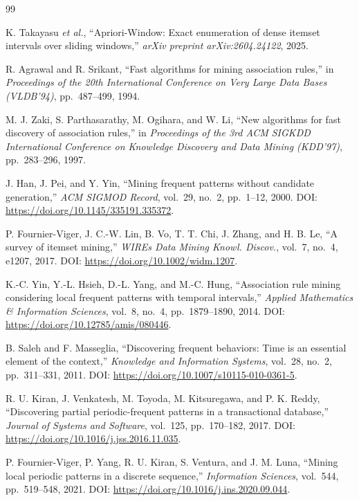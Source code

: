 \documentclass[10pt,twocolumn]{AROB}
\begin{document}
\begin{thebibliography}{99}

K. Takayasu {\it et al.},
``Apriori-Window: Exact enumeration of dense itemset intervals over sliding windows,''
{\it arXiv preprint arXiv:2604.24122}, 2025.

R. Agrawal and R. Srikant,
``Fast algorithms for mining association rules,''
in \textit{Proceedings of the 20th International Conference on Very Large Data Bases (VLDB'94)},
pp.~487--499, 1994.

M. J. Zaki, S. Parthasarathy, M. Ogihara, and W. Li,
``New algorithms for fast discovery of association rules,''
in \textit{Proceedings of the 3rd ACM SIGKDD International Conference on Knowledge Discovery and Data Mining (KDD'97)},
pp.~283--296, 1997.

J. Han, J. Pei, and Y. Yin,
``Mining frequent patterns without candidate generation,''
\textit{ACM SIGMOD Record}, vol.~29, no.~2, pp.~1--12, 2000.
DOI: \url{https://doi.org/10.1145/335191.335372}.

P. Fournier-Viger, J. C.-W. Lin, B. Vo, T. T. Chi, J. Zhang, and H. B. Le,
``A survey of itemset mining,''
{\it WIREs Data Mining Knowl. Discov.}, vol.~7, no.~4, e1207, 2017.
DOI: \url{https://doi.org/10.1002/widm.1207}.

K.-C. Yin, Y.-L. Hsieh, D.-L. Yang, and M.-C. Hung,
``Association rule mining considering local frequent patterns with temporal intervals,''
{\it Applied Mathematics \& Information Sciences}, vol.~8, no.~4,
pp.~1879--1890, 2014.
DOI: \url{https://doi.org/10.12785/amis/080446}.

B. Saleh and F. Masseglia,
``Discovering frequent behaviors: Time is an essential element of the context,''
{\it Knowledge and Information Systems}, vol.~28, no.~2, pp.~311--331, 2011.
DOI: \url{https://doi.org/10.1007/s10115-010-0361-5}.

R. U. Kiran, J. Venkatesh, M. Toyoda, M. Kitsuregawa, and P. K. Reddy,
``Discovering partial periodic-frequent patterns in a transactional database,''
{\it Journal of Systems and Software}, vol.~125, pp.~170--182, 2017.
DOI: \url{https://doi.org/10.1016/j.jss.2016.11.035}.

P. Fournier-Viger, P. Yang, R. U. Kiran, S. Ventura, and J. M. Luna,
``Mining local periodic patterns in a discrete sequence,''
{\it Information Sciences}, vol.~544, pp.~519--548, 2021.
DOI: \url{https://doi.org/10.1016/j.ins.2020.09.044}.


\end{thebibliography}
\end{document}

